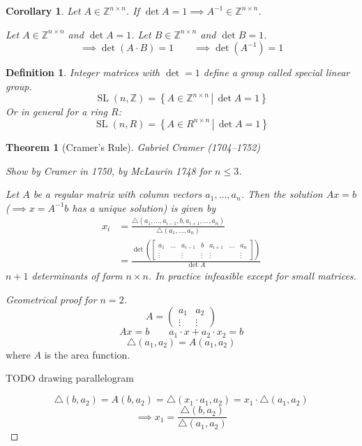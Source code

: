 \documentclass{article}
\newtheorem{theorem}{Theorem}  \numberwithin{theorem}{section}
\newtheorem{definition}{Definition}  \numberwithin{definition}{section}
\newtheorem*{corollary}{Corollary}%
\newcommand{\setdef}[2]{\left\{\left.#1\,\right|\,#2\right\}}
\begin{document}
\begin{corollary}
  Let $A \in \mathbb Z^{n\times n}$.
  If $\det{A} = 1 \implies A^{-1} \in \mathbb Z^{n \times n}$.

  Let $A \in \mathbb Z^{n \times n}$ and $\det{A} = 1$.
  Let $B \in \mathbb Z^{n \times n}$ and $\det{B} = 1$.
  \[ \implies \det(A \cdot B) = 1 \qquad \implies \det(A^{-1}) = 1 \]
\end{corollary}

\begin{definition}
  Integer matrices with $\det = 1$ define a group called \emph{special linear group}.
  \[ \operatorname{SL}(n, \mathbb Z) = \setdef{A \in \mathbb Z^{n \times n}}{\det{A} = 1} \]
  Or in general for a ring $R$:
  \[ \operatorname{SL}(n, R) = \setdef{A \in R^{n \times n}}{\det{A} = 1} \]
\end{definition}

\begin{theorem}[Cramer's Rule]
  Gabriel Cramer (1704--1752)

  Show by Cramer in 1750, by McLaurin 1748 for $n \leq 3$.

  Let $A$ be a regular matrix with column vectors $a_1, \dots, a_n$.
  Then the solution $Ax = b$ ($\implies x = A^{-1} b$ has a unique solution) is given by
  \begin{align*}
    x_i &= \frac{\triangle (a_1, \dots, a_{i-1}, b, a_{i+1}, \dots, a_n)}{\triangle (a_1, \dots, a_n)} \\
        &= \frac{\det\left(\begin{bmatrix} a_1 & \dots & a_{i-1} & b & a_{i+1} & \dots & a_{n} \\ \vdots &  & \vdots & \vdots & \vdots & & \vdots \end{bmatrix}\right)}{\det{A}}
  \end{align*}
  $n+1$ determinants of form $n \times n$. In practice infeasible except for small matrices.
\end{theorem}

\begin{proof}[Geometrical proof for $n=2$]
  \[ A = \begin{pmatrix} a_1 & a_2 \\ \vdots & \vdots \end{pmatrix} \]
  \[ Ax = b \qquad a_1 \cdot x + a_2 \cdot x_2 = b \]
  \[ \triangle (a_1, a_2) = A(a_1, a_2) \]
  where $A$ is the area function.

  TODO drawing parallelogram

  \[ \triangle(b, a_2) = A(b, a_2) = \triangle(x_1 \cdot a_1, a_2) = x_1 \cdot \triangle(a_1, a_2) \]
  \[ \implies x_1 = \frac{\triangle (b, a_2)}{\triangle (a_1, a_2)} \]
\end{proof}
\end{document}
